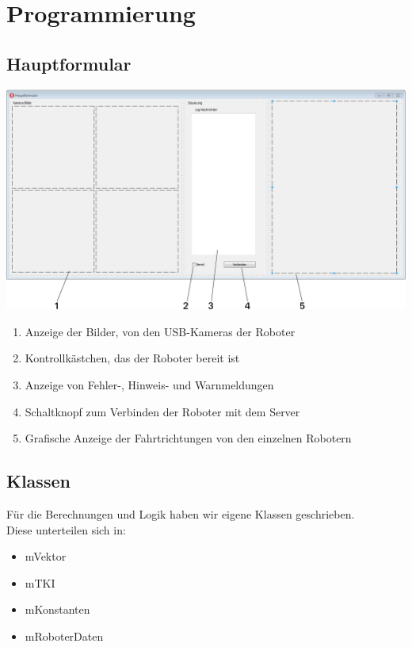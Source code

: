 \section{Programmierung}

\subsection{Hauptformular}
\begin{center}
	\includegraphics[scale=0.4]{Bilder/GUI.pdf}
\end{center}
\begin{enumerate}
	\item Anzeige der Bilder, von den USB-Kameras der Roboter 
	\item Kontrollkästchen, das der Roboter bereit ist
	\item Anzeige von Fehler-, Hinweis- und Warnmeldungen
	\item Schaltknopf zum Verbinden der Roboter mit dem Server
	\item Grafische Anzeige der Fahrtrichtungen von den einzelnen Robotern\\
\end{enumerate}


\subsection{Klassen}
Für die Berechnungen und Logik haben wir eigene Klassen geschrieben.\\
\newline
Diese unterteilen sich in:
\begin{itemize}
	\item mVektor
	\item mTKI
	\item mKonstanten
	\item mRoboterDaten
\end{itemize}

